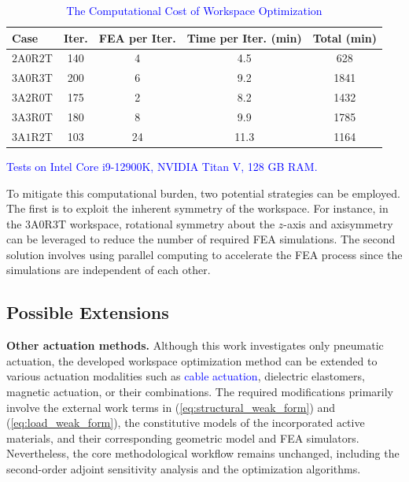 \documentclass[journal]{IEEEtran}
\theoremstyle{definition}
\begin{document}
\begin{table}
  \centering
  \caption{\textcolor{blue}{The Computational Cost of Workspace Optimization}}
  \label{tab:comp_cost}
  \begin{threeparttable}
  \begin{tabular}{lcccc}
    \toprule
    Case & Iter. & FEA per Iter. & Time per Iter. (min) & Total (min) \\
    \midrule
    $2$A$0$R$2$T & 140 & 4 & 4.5 & 628 \\
    $3$A$0$R$3$T & 200 & 6 & 9.2 & 1841 \\
    $3$A$2$R$0$T & 175 & 2 & 8.2 & 1432 \\
    $3$A$3$R$0$T & 180 & 8 & 9.9 & 1785 \\
    $3$A$1$R$2$T & 103 & 24 & 11.3 & 1164 \\
    \bottomrule
  \end{tabular}
  \begin{tablenotes}
    \item[*] \footnotesize{\textcolor{blue}{Tests on Intel Core i9-12900K, NVIDIA Titan V, 128 GB RAM.}}
  \end{tablenotes}
  \end{threeparttable}
\end{table}

To mitigate this computational burden, two potential strategies can be employed. The first is to exploit the inherent symmetry of the workspace. For instance, in the \(3\text{A}0\text{R}3\text{T}\) workspace, rotational symmetry about the \(z\)-axis and axisymmetry can be leveraged to reduce the number of required FEA simulations. The second solution involves using parallel computing to accelerate the FEA process since the simulations are independent of each other.

\subsection{Possible Extensions}
\label{sec:discussion:extensions}

\textbf{Other actuation methods.} Although this work investigates only pneumatic actuation, the developed workspace optimization method can be extended to various actuation modalities such as \textcolor{blue}{cable actuation}, dielectric elastomers, magnetic actuation, or their combinations. The required modifications primarily involve the external work terms in (\ref{eq:structural_weak_form}) and (\ref{eq:load_weak_form}), the constitutive models of the incorporated active materials, and their corresponding geometric model and FEA simulators. Nevertheless, the core methodological workflow remains unchanged, including the second-order adjoint sensitivity analysis and the optimization algorithms.
\end{document}
